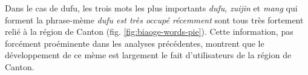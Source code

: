 Dans le cas de dufu, les trois mots les plus importants \textit{dufu}, \textit{zuijin} et \textit{mang} qui forment la phrase-m\`eme \textit{dufu est tr\`es occup\'e r\'ecemment }sont tous tr\`es fortement reli\'e \`a la r\'egion de Canton (fig. \ref{fig:biaoge-words-pie}). Cette information, pas forc\'ement pro\'eminente dans les analyses pr\'ec\'edentes, montrent que le d\'eveloppement de ce m\`eme est largement le fait d{\textquoteright}utilisateurs de la r\'egion de Canton.